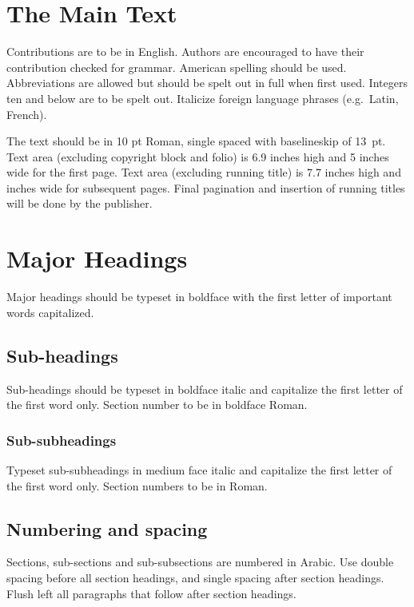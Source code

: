 \documentclass{ws-ijait}
\begin{document}
\section{The Main Text}

Contributions are to be in English. Authors are encouraged to
have their contribution checked for grammar. American spelling
should be used. Abbreviations are allowed but should be spelt
out in full when first used. Integers ten and below are to be
spelt out. Italicize foreign language phrases (e.g.~Latin,
French).

The text should be in 10 pt Roman, single spaced with
baselineskip of 13~pt. Text area (excluding copyright block and folio)
is 6.9 inches high and 5 inches wide for the first page.
Text area (excluding running title) is 7.7 inches high and inches wide for subsequent pages.  Final pagination and
insertion of running titles will be done by the publisher.

\section{Major Headings}

Major headings should be typeset in boldface with the first
letter of important words capitalized.

\subsection{Sub-headings}

Sub-headings should be typeset in boldface italic and capitalize
the first letter of the first word only. Section number to be in
boldface Roman.

\subsubsection{Sub-subheadings}

Typeset sub-subheadings in medium face italic and capitalize the
first letter of the first word only. Section numbers to be in
Roman.

\subsection{Numbering and spacing}

Sections, sub-sections and sub-subsections are numbered in
Arabic.  Use double spacing before all section headings, and
single spacing after section headings. Flush left all paragraphs
that follow after section headings.
\end{document}
